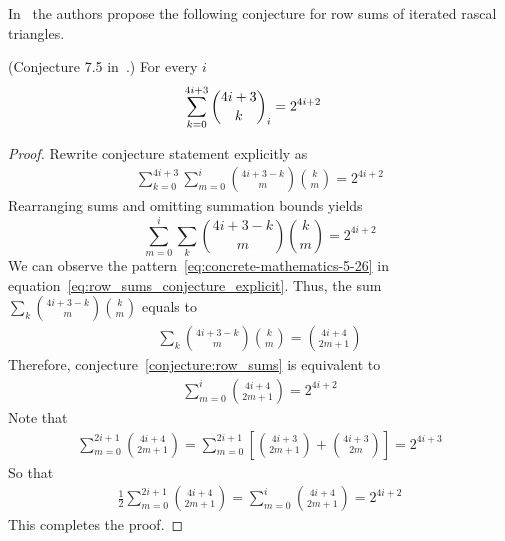 ﻿In~\cite{gregory2023iterated} the authors
propose the following conjecture for row sums of iterated rascal triangles.
\begin{conj}
    \label{conjecture:row_sums}
    (Conjecture 7.5 in~\cite{gregory2023iterated}.)
    For every $i$
    \begin{align*}
        \sum_{k=0}^{4i+3} \binom{4i+3}{k}_{i} &= 2^{4i+2}
    \end{align*}
\end{conj}
\begin{proof}
    Rewrite conjecture statement explicitly as
    \begin{align*}
        \sum_{k=0}^{4i+3} \sum_{m=0}^{i} \binom{4i+3-k}{m} \binom{k}{m} = 2^{4i+2}
    \end{align*}
    Rearranging sums and omitting summation bounds yields
    \begin{equation}
        \sum_{m=0}^{i}  \sum_{k} \binom{4i+3-k}{m} \binom{k}{m} = 2^{4i+2}\label{eq:row_sums_conjecture_explicit}
    \end{equation}
    We can observe the pattern~\eqref{eq:concrete-mathematics-5-26}
    in equation~\eqref{eq:row_sums_conjecture_explicit}.
    Thus, the sum $\sum_{k} \binom{4i+3-k}{m} \binom{k}{m}$ equals to
    \begin{align*}
        \sum_{k} \binom{4i+3-k}{m} \binom{k}{m} = \binom{4i+4}{2m+1}
    \end{align*}
    Therefore, conjecture~\eqref{conjecture:row_sums} is equivalent to
    \begin{align*}
        \sum_{m=0}^{i} \binom{4i+4}{2m+1} = 2^{4i+2}
    \end{align*}
    Note that
    \begin{align*}
        \sum_{m=0}^{2i+1} \binom{4i+4}{2m+1}= \sum_{m=0}^{2i+1} \left[ \binom{4i+3}{2m+1} + \binom{4i+3}{2m} \right] = 2^{4i+3}
    \end{align*}
    So that
    \begin{align*}
        \frac{1}{2} \sum_{m=0}^{2i+1} \binom{4i+4}{2m+1} = \sum_{m=0}^{i} \binom{4i+4}{2m+1} = 2^{4i+2}
    \end{align*}
    This completes the proof.
\end{proof}
